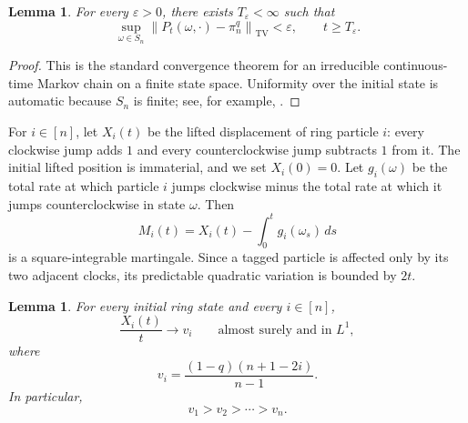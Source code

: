 \documentclass[11pt,a4paper]{amsart}
\newtheorem{lemma}[theorem]{Lemma}
\theoremstyle{definition}
\theoremstyle{remark}
\numberwithin{equation}{section}
\newcommand{\TV}{\mathrm{TV}}
\newcommand{\norm}[1]{\left\lVert #1\right\rVert}
\begin{document}
	\begin{lemma}\label{lem:ring-mixing}
		For every $\varepsilon>0$, there exists $T_\varepsilon<\infty$ such that
		\begin{equation}\label{eq:ring-mixing}
			\sup_{\omega\in S_n}
			\norm{P_t(\omega,\cdot)-\pi_n^q}_{\TV}<\varepsilon,
			\qquad t\ge T_\varepsilon.
		\end{equation}
	\end{lemma}
	
	\begin{proof}
		This is the standard convergence theorem for an irreducible continuous-time
		Markov chain on a finite state space.  Uniformity over the initial state is
		automatic because $S_n$ is finite; see, for example,
		\cite[Chapter~4]{LevinPeres}.
	\end{proof}
	
	For $i\in[n]$, let $X_i(t)$ be the lifted displacement of ring particle $i$:
	every clockwise jump adds $1$ and every counterclockwise jump subtracts $1$ from it.
	The initial lifted position is immaterial, and we set $X_i(0)=0$.  Let
	$g_i(\omega)$ be the total rate at which particle $i$ jumps clockwise minus
	the total rate at which it jumps counterclockwise in state $\omega$.  Then
	\begin{equation}\label{eq:ring-martingale}
		M_i(t)=X_i(t)-\int_0^t g_i(\omega_s)\,ds
	\end{equation}
	is a square-integrable martingale.  Since a tagged particle is affected only
	by its two adjacent clocks, its predictable quadratic variation is bounded
	by $2t$.
	
	\begin{lemma}\label{lem:ring-velocity}
		For every initial ring state and every $i\in[n]$,
		\begin{equation}\label{eq:ring-velocity-lln}
			\frac{X_i(t)}{t}\longrightarrow v_i
			\qquad\text{almost surely and in }L^1,
		\end{equation}
		where
		\begin{equation}\label{eq:ring-velocities}
			v_i=\frac{(1-q)(n+1-2i)}{n-1}.
		\end{equation}
		In particular,
		\begin{equation}\label{eq:strict-velocity-order}
			v_1>v_2>\cdots>v_n.
		\end{equation}
	\end{lemma}
	
\end{document}
